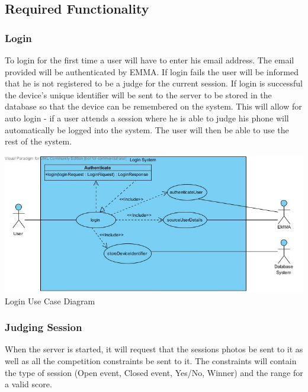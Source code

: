 \documentclass[10pt,a4paper]{article}
\begin{document}
\subsection{Required Functionality}
\subsubsection{Login}
To login for the first time a user will have to enter his email address. The email provided will be authenticated by EMMA. If login fails the user will be informed that he is not registered to be a judge for the current session. If login is successful the device's unique identifier will be sent to the server to be stored in the database so that the device can be remembered on the system. This will allow for auto login - if a user attends a session where he is able to judge his phone will automatically be logged into the system. The user will then be able to use the rest of the system.

\begin{center}
\advance\leftskip-1.3cm
\includegraphics[width=160mm]{Pictures/Login.jpg} 
Login Use Case Diagram 
\end{center}

\subsubsection{Judging Session}
When the server is started, it will request that the sessions photos be sent to it as well as all the competition constraints be sent to it. The constraints will contain the type of session (Open event, Closed event, Yes/No, Winner) and the range for a valid score.
\end{document}
